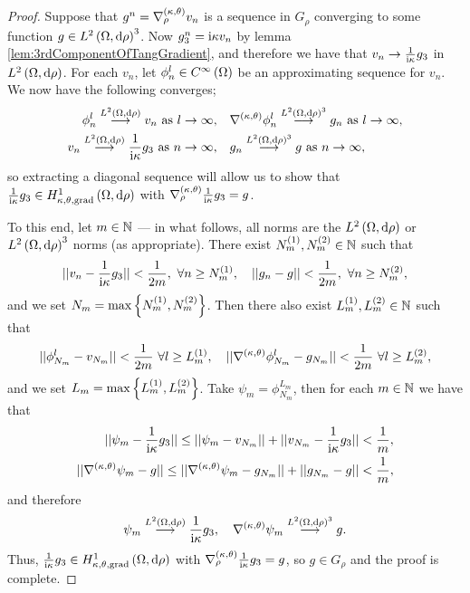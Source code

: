 \documentclass[11pt]{report}
\begin{document}
\begin{proof}
	Suppose that $g^n = \nabla^{\left( \kappa, \theta \right)}_\rho v_n$ is a sequence in $G_\rho$ converging to some function $g\in L^{2}\left( \Omega,\mathrm{d}\rho \right)^3$.
	Now $g^n_3 = \mathrm{i}\kappa v_n$ by lemma \ref{lem:3rdComponentOfTangGradient}, and therefore we have that $v_n\rightarrow\frac{1}{\mathrm{i}\kappa}g_3$ in $L^{2}\left( \Omega,\mathrm{d}\rho \right)$.
	For each $v_n$, let $\phi_n^l\in C^{\infty}\left( \Omega \right)$ be an approximating sequence for $v_n$.
	We now have the following converges;
	\begin{align*}
		\phi^l_n \overset{L^{2}\left( \Omega,\mathrm{d}\rho \right)}{\longrightarrow} v_n \ \text{as} \ l \rightarrow\infty,
		&\quad \nabla^{\left( \kappa, \theta \right)}\phi^l_n \overset{L^{2}\left( \Omega,\mathrm{d}\rho \right)^3}{\longrightarrow} g_n \ \text{as} \ l \rightarrow\infty, \\
		v_n \overset{L^{2}\left( \Omega,\mathrm{d}\rho \right)}{\longrightarrow} \frac{1}{\mathrm{i}\kappa}g_3 \ \text{as} \ n \rightarrow\infty,
		&\quad g_n \overset{L^{2}\left( \Omega,\mathrm{d}\rho \right)^3}{\longrightarrow} g \ \text{as} \ n \rightarrow\infty,
	\end{align*}
	so extracting a diagonal sequence will allow us to show that $\frac{1}{\mathrm{i}\kappa}g_3\in H^1_{\kappa,\theta,\mathrm{grad}}\left( \Omega, \mathrm{d}\rho \right)$ with $\nabla^{\left( \kappa, \theta \right)}_\rho\frac{1}{\mathrm{i}\kappa}g_3 = g$.
	
	To this end, let $m\in\mathbb{N}$ --- in what follows, all norms are the $L^{2}\left( \Omega,\mathrm{d}\rho \right)$ or $L^{2}\left( \Omega,\mathrm{d}\rho \right)^3$ norms (as appropriate).
	There exist $N_m^{(1)}, N_m^{(2)}\in\mathbb{N}$ such that
	\begin{align*}
		\norm{v_n - \recip{\rmi\wavenumber}g_3} < \recip{2m}, \ \forall n\geq N_m^{(1)},
		\quad
		\norm{g_n - g} < \recip{2m}, \ \forall n\geq N_m^{(2)},
	\end{align*}
	and we set $N_m = \max\left\{ N_m^{(1)}, N_m^{(2)} \right\}$.
	Then there also exist $L_m^{(1)}, L_m^{(2)}\in\mathbb{N}$ such that
	\begin{align*}
		\lvert\lvert \phi^l_{N_m} - v_{N_m} \rvert\rvert < \frac{1}{2m} \ \forall l\geq L_m^{(1)},
		\quad
		\lvert\lvert \nabla^{\left( \kappa, \theta \right)}\phi^l_{N_m} - g_{N_m} \rvert\rvert < \frac{1}{2m} \ \forall l\geq L_m^{(2)},
	\end{align*}
	and we set $L_m = \max\left\{ L_m^{(1)}, L_m^{(2)} \right\}$.
	Take $\psi_m = \phi^{L_m}_{N_m}$, then for each $m\in\mathbb{N}$ we have that
	\begin{align*}
		\lvert\lvert \psi_m - \frac{1}{\mathrm{i}\kappa}g_3 \rvert\rvert \leq \lvert\lvert \psi_m - v_{N_m} \rvert\rvert + \lvert\lvert v_{N_m} - \frac{1}{\mathrm{i}\kappa}g_3 \rvert\rvert < \frac{1}{m}, \\
		\lvert\lvert \nabla^{\left( \kappa, \theta \right)}\psi_m - g \rvert\rvert \leq \lvert\lvert \nabla^{\left( \kappa, \theta \right)}\psi_m - g_{N_m} \rvert\rvert + \lvert\lvert g_{N_m} - g \rvert\rvert < \frac{1}{m},
	\end{align*}
	and therefore
	\begin{align*}
		\psi_m \overset{L^{2}\left( \Omega,\mathrm{d}\rho \right)}{\longrightarrow} \frac{1}{\mathrm{i}\kappa}g_3, 
		\quad
		\nabla^{\left( \kappa, \theta \right)}\psi_m \overset{L^{2}\left( \Omega,\mathrm{d}\rho \right)^3}{\longrightarrow} g.
	\end{align*}
	Thus, $\frac{1}{\mathrm{i}\kappa}g_3\in H^1_{\kappa,\theta,\mathrm{grad}}\left( \Omega, \mathrm{d}\rho \right)$ with $\nabla^{\left( \kappa, \theta \right)}_\rho\frac{1}{\mathrm{i}\kappa}g_3 = g$, so $g\in G_\rho$ and the proof is complete.
\end{proof}
\end{document}
